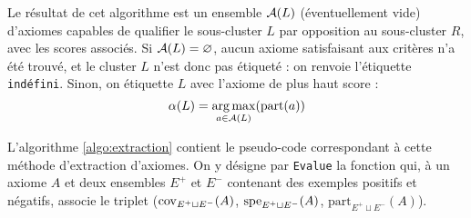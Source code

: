 Le résultat de cet algorithme est un ensemble $\cal{A}(L)$ (éventuellement vide) d'axiomes capables de qualifier le sous-cluster $L$ par opposition au sous-cluster $R$, avec les scores associés. Si $\cal{A}(L) = \varnothing$, aucun axiome satisfaisant aux critères n'a été trouvé, et le cluster $L$ n'est donc pas étiqueté : on renvoie l'étiquette \texttt{indéfini}. Sinon, on étiquette $L$ avec l'axiome de plus haut score :
\begin{equation}
    \alpha(L) = \argmax_{a \in \cal{A}(L)}(\text{part}(a))
\end{equation}

L'algorithme \ref{algo:extraction} contient le pseudo-code correspondant à cette méthode d'extraction d'axiomes. On y désigne par \texttt{Evalue} la fonction qui, à un axiome $A$ et deux ensembles $E^+$ et $E^-$ contenant des exemples positifs et négatifs, associe le triplet ($\cov_{E^+ \sqcup E^-}(A)$, $\spe_{E^+ \sqcup E^-}(A)$, $\textrm{part}_{E^+ \sqcup E^-}(A)$).


